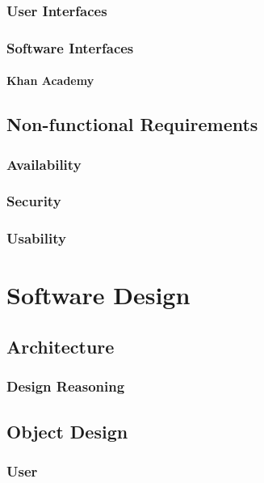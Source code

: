 \subsection{User Interfaces}

\subsection{Software Interfaces}

\subsubsection{Khan Academy}

\section{Non-functional Requirements}

\subsection{Availability}

\subsection{Security}

\subsection{Usability}


\chapter{Software Design}

\section{Architecture}

\subsection{Design Reasoning}

\section{Object Design}

\subsection{User}

